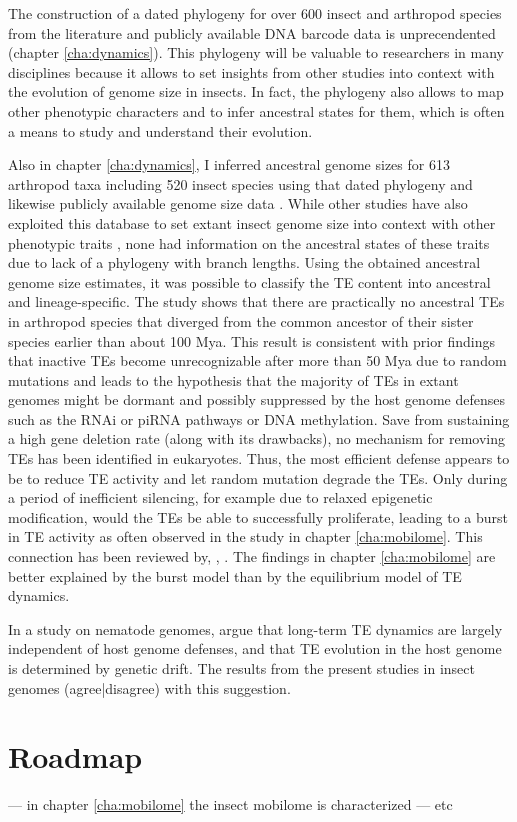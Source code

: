 The construction of a dated phylogeny for over 600 insect and arthropod
species from the literature and publicly available DNA barcode data is
unprecendented (chapter \ref{cha:dynamics}). This phylogeny will be
valuable to researchers in many disciplines because it allows to set
insights from other studies into context with the evolution of genome
size in insects.  In fact, the phylogeny also allows to map other
phenotypic characters and to infer ancestral states for them, which is
often a means to study and understand their evolution.

Also in chapter \ref{cha:dynamics}, I inferred ancestral genome sizes
for 613 arthropod taxa including 520 insect species using that dated
phylogeny and likewise publicly available genome size data
\citep{Gregory2018}. While other studies have also exploited this
database to set extant insect genome size into context with other
phenotypic traits \citep{Alfsnes2017, Gregory2011}, none had information
on the ancestral states of these traits due to lack of a phylogeny with
branch lengths. Using the obtained ancestral genome size estimates, it
was possible to classify the TE content into ancestral and
lineage-specific. The study shows that there are practically no
ancestral TEs in arthropod species that diverged from the common
ancestor of their sister species earlier than about 100 Mya. This result
is consistent with prior findings that inactive TEs become
unrecognizable after more than 50 Mya due to random mutations
\citep{Shedlock2000} and leads to the hypothesis that the majority of
TEs in extant genomes might be dormant and possibly suppressed by the
host genome defenses such as the RNAi or piRNA pathways or DNA
methylation. Save from sustaining a high gene deletion rate (along with
its drawbacks), no mechanism for removing TEs has been identified in
eukaryotes. Thus, the most efficient defense appears to be to reduce TE
activity and let random mutation degrade the TEs.  Only during a period
of inefficient silencing, for example due to relaxed epigenetic
modification, would the TEs be able to successfully proliferate, leading
to a burst in TE activity as often observed in the study in chapter
\ref{cha:mobilome}. This connection has been reviewed by, \eg,
\citet{Slotkin2007, Zeh2009, Rebollo2010}. The findings in chapter
\ref{cha:mobilome} are better explained by the burst model than by the
equilibrium model of TE dynamics.

In a study on nematode genomes, \citet{Szitenberg2016} argue that
long-term TE dynamics are largely independent of host genome defenses,
and that TE evolution in the host genome is determined by genetic drift.
The results from the present studies in insect genomes (agree|disagree)
with this suggestion. 

\section{Roadmap}

  --- in chapter
\ref{cha:mobilome} the insect mobilome is characterized --- etc
